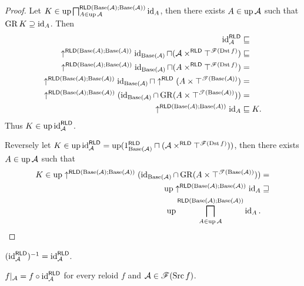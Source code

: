 \begin{proof}
Let $K\in\operatorname{up}\bigsqcap_{A\in\operatorname{up}\mathcal{A}}^{\mathsf{RLD}(\operatorname{Base}(\mathcal{A});\operatorname{Base}(\mathcal{A}))}\operatorname{id}_{A}$,
then there exists $A\in\operatorname{up}\mathcal{A}$ such that $\operatorname{GR} K\supseteq\operatorname{id}_{A}$.
Then
\begin{align*}
\operatorname{id}_{\mathcal{A}}^{\mathsf{RLD}} & \sqsubseteq\\
\uparrow^{\mathsf{RLD}(\operatorname{Base}(\mathcal{A});\operatorname{Base}(\mathcal{A}))}\operatorname{id}_{\operatorname{Base}(\mathcal{A})}\sqcap(\mathcal{A}\times^{\mathsf{RLD}}\top^{\mathscr{F}(\operatorname{Dst} f)}) & \sqsubseteq\\
\uparrow^{\mathsf{RLD}(\operatorname{Base}(\mathcal{A});\operatorname{Base}(\mathcal{A}))}\operatorname{id}_{\operatorname{Base}(\mathcal{A})}\sqcap(A\times^{\mathsf{RLD}}\top^{\mathscr{F}(\operatorname{Dst} f)}) & =\\
\uparrow^{\mathsf{RLD}(\operatorname{Base}(\mathcal{A});\operatorname{Base}(\mathcal{A}))}\operatorname{id}_{\operatorname{Base}(\mathcal{A})}\sqcap\uparrow^{\mathsf{RLD}}(A\times\top^{\mathscr{T}(\operatorname{Base}(\mathcal{A}))}) & =\\
\uparrow^{\mathsf{RLD}(\operatorname{Base}(\mathcal{A});\operatorname{Base}(\mathcal{A}))}(\operatorname{id}_{\operatorname{Base}(\mathcal{A})}\cap\operatorname{GR}(A\times\top^{\mathscr{T}(\operatorname{Base}(\mathcal{A}))})) & =\\
\uparrow^{\mathsf{RLD}(\operatorname{Base}(\mathcal{A});\operatorname{Base}(\mathcal{A}))}\operatorname{id}_{A} & \sqsubseteq K.
\end{align*}
Thus $K\in\operatorname{up}\operatorname{id}_{\mathcal{A}}^{\mathsf{RLD}}$.

Reversely let $K\in\operatorname{up}\operatorname{id}_{\mathcal{A}}^{\mathsf{RLD}}=\operatorname{up}(1_{\operatorname{Base}(\mathcal{A})}^{\mathsf{RLD}}\sqcap(\mathcal{A}\times^{\mathsf{RLD}}\top^{\mathscr{F}(\operatorname{Dst} f)}))$,
then there exists $A\in\operatorname{up}\mathcal{A}$ such that 
\begin{align*}
K\in\operatorname{up}\uparrow^{\mathsf{RLD}(\operatorname{Base}(\mathcal{A});\operatorname{Base}(\mathcal{A}))}(\operatorname{id}_{\operatorname{Base}(\mathcal{A})}\cap\operatorname{GR}(A\times\top^{\mathscr{T}(\operatorname{Base}(\mathcal{A}))})) & =\\
\operatorname{up}\uparrow^{\mathsf{RLD}(\operatorname{Base}(\mathcal{A});\operatorname{Base}(\mathcal{A}))}\operatorname{id}_{A} & \sqsupseteq\\
\operatorname{up}\bigsqcap_{A\in\operatorname{up}\mathcal{A}}^{\mathsf{RLD}(\operatorname{Base}(\mathcal{A});\operatorname{Base}(\mathcal{A}))}\operatorname{id}_{A}.
\end{align*}
\end{proof}
\begin{cor}
$(\operatorname{id}_{\mathcal{A}}^{\mathsf{RLD}})^{-1}=\operatorname{id}_{\mathcal{A}}^{\mathsf{RLD}}$.\end{cor}
\begin{thm}
$f|_{\mathcal{A}}=f\circ\operatorname{id}_{\mathcal{A}}^{\mathsf{RLD}}$ for every
reloid $f$ and $\mathcal{A}\in\mathscr{F}(\operatorname{Src} f)$.\end{thm}
